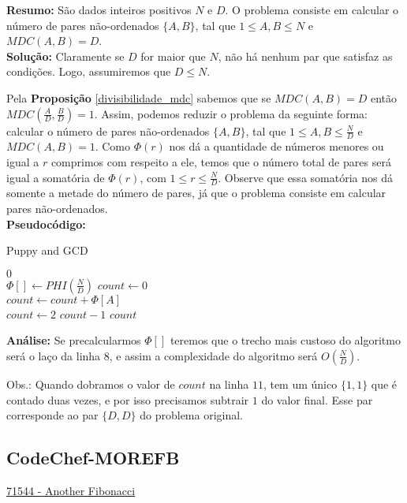 \textbf{Resumo:}
São dados inteiros positivos $N$ e $D$. O problema consiste em calcular o número de pares não-ordenados $\{A,B\}$, tal que $1\leq A,B \leq N$ e $MDC(A,B)=D$.
\\

\textbf{Solução:}
Claramente se $D$ for maior que $N$, não há nenhum par que satisfaz as condições. Logo, assumiremos que $D \leq N$.

Pela \textbf{Proposição} \autoref{divisibilidade_mdc} sabemos que se $MDC(A,B)=D$ então $MDC(\frac{A}{D}, \frac{B}{D})=1$. Assim, podemos reduzir o problema da seguinte forma:
calcular o número de pares não-ordenados $\{A,B\}$, tal que $1\leq A,B \leq \frac{N}{D}$ e $MDC(A,B)=1$.
Como $\Phi(r)$ nos dá a quantidade de números menores ou igual a $r$ comprimos com respeito a ele, temos que 
o número total de pares será igual a somatória de $\Phi(r)$, com $1 \leq r \leq \frac{N}{D}$.
Observe que essa somatória nos dá somente a metade do número de pares, já que o problema consiste em calcular pares não-ordenados.
\\

\textbf{Pseudocódigo:}
\begin{algorithm}
\caption{Puppy and GCD}
\begin{algorithmic}[1]
\State \Return $0$
\EndIf
\\
\State $\Phi[] \gets PHI(\frac{N}{D})$
\State $count \gets 0$
\\
\State $count \gets count + \Phi[A]$
\EndFor
\\
\State $count \gets 2$ $count - 1$
\State \Return $count$
\EndProcedure
\end{algorithmic}
\end{algorithm}

\textbf{Análise:}
Se precalcularmos $\Phi[]$ teremos que o trecho mais custoso do algoritmo será o laço da linha $8$, e assim a complexidade do algoritmo será $O(\frac{N}{D})$.

Obs.: Quando dobramos o valor de $count$ na linha $11$, tem um único $\{1,1\}$ que é contado duas vezes, e por isso precisamos subtrair $1$ do valor final. 
Esse par corresponde ao par $\{D,D\}$ do problema original.




\subsection{CodeChef-MOREFB}
\href{https://www.codechef.com/problems/MOREFB}{71544 - Another Fibonacci}\\

